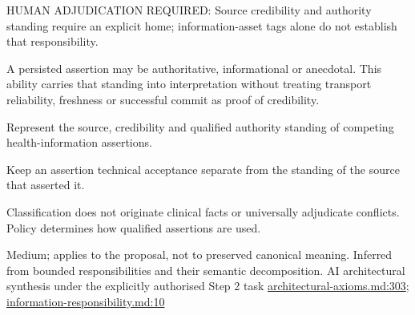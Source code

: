 HUMAN ADJUDICATION REQUIRED: Source credibility and authority standing require an explicit home; information-asset tags alone do not establish that responsibility.



A persisted assertion may be authoritative, informational or anecdotal. This ability carries that standing into interpretation without treating transport reliability, freshness or successful commit as proof of credibility.



Represent the source, credibility and qualified authority standing of competing health-information assertions.



Keep an assertion technical acceptance separate from the standing of the source that asserted it.



Classification does not originate clinical facts or universally adjudicate conflicts. Policy determines how qualified assertions are used.


Medium; applies to the proposal, not to preserved canonical meaning.
Inferred from bounded responsibilities and their semantic decomposition. AI architectural synthesis under the explicitly authorised Step 2 task \hyperref[evidence:27549d51551beae6]{architectural-axioms.md:303}; \hyperref[evidence:be61392fefb4bb10]{information-responsibility.md:10}
